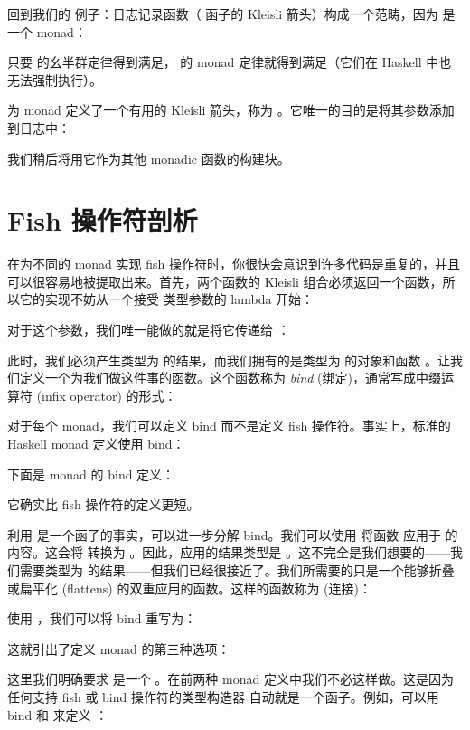 回到我们的  例子：日志记录函数（ 函子的 Kleisli 箭头）构成一个范畴，因为  是一个 monad：

只要  的幺半群定律得到满足， 的 monad 定律就得到满足（它们在 Haskell 中也无法强制执行）。

为  monad 定义了一个有用的 Kleisli 箭头，称为 。它唯一的目的是将其参数添加到日志中：

我们稍后将用它作为其他 monadic 函数的构建块。

\section{Fish 操作符剖析}

在为不同的 monad 实现 fish 操作符时，你很快会意识到许多代码是重复的，并且可以很容易地被提取出来。首先，两个函数的 Kleisli 组合必须返回一个函数，所以它的实现不妨从一个接受  类型参数的 lambda 开始：

对于这个参数，我们唯一能做的就是将它传递给 ：

此时，我们必须产生类型为  的结果，而我们拥有的是类型为  的对象和函数 。让我们定义一个为我们做这件事的函数。这个函数称为 \emph{bind} (绑定)，通常写成中缀运算符 (infix operator) 的形式：

对于每个 monad，我们可以定义 bind 而不是定义 fish 操作符。事实上，标准的 Haskell monad 定义使用 bind：

下面是  monad 的 bind 定义：

它确实比 fish 操作符的定义更短。

利用  是一个函子的事实，可以进一步分解 bind。我们可以使用  将函数  应用于  的内容。这会将  转换为 。因此，应用的结果类型是 。这不完全是我们想要的——我们需要类型为  的结果——但我们已经很接近了。我们所需要的只是一个能够折叠或扁平化 (flattens)  的双重应用的函数。这样的函数称为  (连接)：

使用 ，我们可以将 bind 重写为：

这就引出了定义 monad 的第三种选项：

这里我们明确要求  是一个 。在前两种 monad 定义中我们不必这样做。这是因为任何支持 fish 或 bind 操作符的类型构造器  自动就是一个函子。例如，可以用 bind 和  来定义 ：

